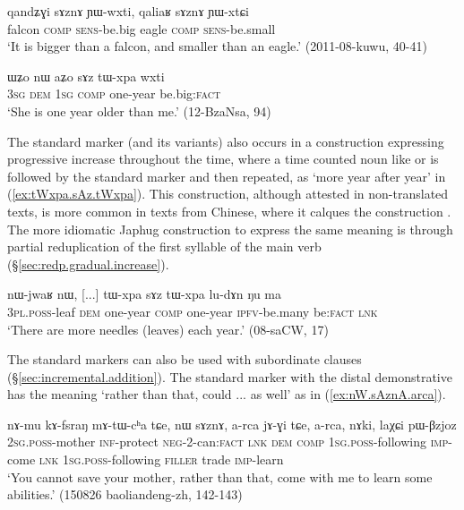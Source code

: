 \begin{exe}
\ex \label{ex:sAznA.YWwxti}
\gll  qandʑɣi sɤznɤ ɲɯ-wxti, qaliaʁ sɤznɤ ɲɯ-xtɕi \\
falcon \textsc{comp} \textsc{sens}-be.big eagle \textsc{comp} \textsc{sens}-be.small \\
\glt `It is bigger than a falcon, and smaller than an eagle.' (2011-08-kuwu, 40-41)
\end{exe}

\begin{exe}
\ex \label{ex:aZo.YWwxti}
\gll ɯʑo nɯ aʑo sɤz tɯ-xpa wxti  \\
\textsc{3sg} \textsc{dem} \textsc{1sg} \textsc{comp} one-year be.big:\textsc{fact} \\
\glt `She is one year older than me.' (12-BzaNsa, 94)
\end{exe}

The standard marker  (and its variants) also occurs in a  construction expressing progressive increase throughout the time, where a time counted noun like  or  is followed by the standard marker and then repeated, as  `more year after year' in (\ref{ex:tWxpa.sAz.tWxpa}). This construction, although attested in non-translated texts, is more common in texts from Chinese, where it calques the construction . The more idiomatic Japhug construction to express the same meaning is through partial reduplication of the first syllable of the main verb (§\ref{sec:redp.gradual.increase}).
 
 \begin{exe}
 \ex \label{ex:tWxpa.sAz.tWxpa}
 \gll nɯ-jwaʁ nɯ, [...] tɯ-xpa sɤz tɯ-xpa lu-dɤn ŋu ma \\
 \textsc{3pl}.\textsc{poss}-leaf \textsc{dem} { } one-year \textsc{comp} one-year \textsc{ipfv}-be.many be:\textsc{fact} \textsc{lnk} \\
\glt  `There are more needles (leaves) each year.' (08-saCW, 17)
\end{exe}
 
 The standard markers can also be used with subordinate clauses (§\ref{sec:incremental.addition}). The standard marker with the distal demonstrative  has the meaning `rather than that, could ... as well' as in (\ref{ex:nW.sAznA.arca}).  
 
 \begin{exe}
 \ex \label{ex:nW.sAznA.arca}
 \gll  nɤ-mu kɤ-fsraŋ mɤ-tɯ-cʰa tɕe, nɯ sɤznɤ, a-rca jɤ-ɣi tɕe, a-rca, nɤki, laχɕi pɯ-βzjoz \\
 \textsc{2sg}.\textsc{poss}-mother \textsc{inf}-protect \textsc{neg}-2-can:\textsc{fact} \textsc{lnk} \textsc{dem} \textsc{comp} \textsc{1sg}.\textsc{poss}-following \textsc{imp}-come \textsc{lnk} \textsc{1sg}.\textsc{poss}-following \textsc{filler} trade \textsc{imp}-learn \\
\glt `You cannot save your mother, rather than that, come with me to learn  some abilities.' (150826 baoliandeng-zh, 142-143)
\end{exe}

